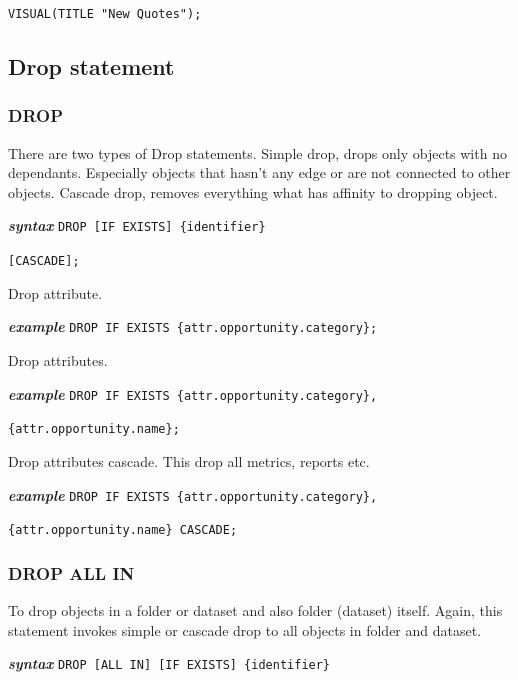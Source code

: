 \documentclass[a4paper, 12pt, titlepage, fleqn]{article}
\begin{document}
\hspace{2.5cm}\verb=VISUAL(TITLE "New Quotes");=

\subsection{Drop statement}
\subsubsection{DROP}
There are two types of Drop statements. Simple drop, drops only objects with no dependants. Especially objects that hasn't any edge or are not connected to other objects. Cascade drop, removes everything what has affinity to dropping object.

\textbf{\emph{syntax}}  \hspace{.9cm}\verb=DROP [IF EXISTS] {identifier}=

\hspace{2.1cm}\verb=[CASCADE];=

\noindent Drop attribute.

\textbf{\emph{example}}  \hspace{.9cm}\verb=DROP IF EXISTS {attr.opportunity.category};=

\noindent Drop attributes.

\textbf{\emph{example}}  \hspace{.9cm}\verb=DROP IF EXISTS {attr.opportunity.category},=

\hspace{2.5cm}\verb={attr.opportunity.name};=

\noindent Drop attributes cascade. This drop all metrics, reports etc.

\textbf{\emph{example}}  \hspace{.9cm}\verb=DROP IF EXISTS {attr.opportunity.category},=

\hspace{2.5cm}\verb={attr.opportunity.name} CASCADE;=

\subsubsection{DROP ALL IN}
To drop objects in a folder or dataset and also folder (dataset) itself. Again, this statement invokes simple or cascade drop to all objects in folder and dataset.

\textbf{\emph{syntax}}  \hspace{.9cm}\verb=DROP [ALL IN] [IF EXISTS] {identifier}=
\end{document}

